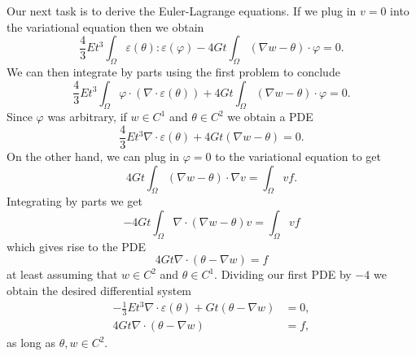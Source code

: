 \documentclass[10pt]{article}
\theoremstyle{definition}
\begin{document}
Our next task is to derive the Euler-Lagrange equations.
If we plug in $v = 0$ into the variational equation then we obtain
$$\frac{4}{3} Et^3 \int_\Omega \varepsilon(\theta):\varepsilon(\varphi) - 4Gt \int_\Omega (\nabla w - \theta) \cdot \varphi = 0.$$
We can then integrate by parts using the first problem to conclude
$$\frac{4}{3} Et^3 \int_\Omega \varphi \cdot (\nabla \cdot \varepsilon(\theta)) + 4Gt \int_\Omega (\nabla w - \theta) \cdot \varphi = 0.$$
Since $\varphi$ was arbitrary, if $w \in C^1$ and $\theta \in C^2$ we obtain a PDE
$$\frac{4}{3} Et^3 \nabla \cdot \varepsilon(\theta) + 4Gt (\nabla w - \theta) = 0.$$
On the other hand, we can plug in $\varphi = 0$ to the variational equation to get
$$4Gt \int_\Omega (\nabla w - \theta) \cdot \nabla v = \int_\Omega vf.$$
Integrating by parts we get
$$-4Gt \int_\Omega \nabla \cdot (\nabla w - \theta) v = \int_\Omega vf$$
which gives rise to the PDE
$$4Gt \nabla \cdot (\theta - \nabla w) = f$$
at least assuming that $w \in C^2$ and $\theta \in C^1$.
Dividing our first PDE by $-4$ we obtain the desired differential system
\begin{align*}
-\frac{1}{3} Et^3 \nabla \cdot \varepsilon(\theta) + Gt (\theta - \nabla w) &= 0, \\
4Gt \nabla \cdot (\theta - \nabla w) &= f,
\end{align*}
as long as $\theta, w \in C^2$.
\end{document}
